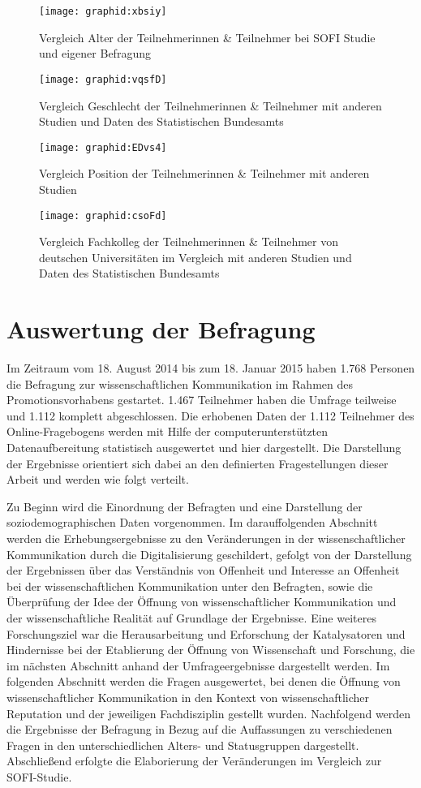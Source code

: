 \begin{figure}[h!]
\texttt{[image: graphid:xbsiy]}
\caption{Vergleich Alter der Teilnehmerinnen & Teilnehmer bei SOFI Studie und eigener Befragung}
\end{figure}

\begin{figure}[h!]
\texttt{[image: graphid:vqsfD]}
\caption{Vergleich Geschlecht der Teilnehmerinnen & Teilnehmer mit anderen Studien und Daten des Statistischen Bundesamts}
\end{figure}

\begin{figure}[h!]
\texttt{[image: graphid:EDvs4]}
\caption{Vergleich Position der Teilnehmerinnen & Teilnehmer mit anderen Studien}
\end{figure}

\begin{figure}[h!]
\texttt{[image: graphid:csoFd]}
\caption{Vergleich Fachkolleg der Teilnehmerinnen & Teilnehmer von deutschen Universitäten im Vergleich mit anderen Studien und Daten des Statistischen Bundesamts}
\end{figure}

\section{Auswertung der Befragung}

Im Zeitraum vom 18. August 2014 bis zum 18. Januar 2015 haben 1.768 Personen die Befragung zur wissenschaftlichen Kommunikation im Rahmen des Promotionsvorhabens gestartet. 1.467 Teilnehmer haben die Umfrage teilweise und 1.112 komplett abgeschlossen. Die erhobenen Daten der 1.112 Teilnehmer des Online-Fragebogens werden mit Hilfe der computerunterstützten Datenaufbereitung statistisch ausgewertet und hier dargestellt. Die Darstellung der Ergebnisse orientiert sich dabei an den definierten Fragestellungen dieser Arbeit und werden wie folgt verteilt.

Zu Beginn wird die Einordnung der Befragten und eine Darstellung der soziodemographischen Daten vorgenommen. Im darauffolgenden Abschnitt werden die Erhebungsergebnisse zu den Veränderungen in der wissenschaftlicher Kommunikation durch die Digitalisierung geschildert, gefolgt von der Darstellung der Ergebnissen über das Verständnis von Offenheit und Interesse an Offenheit bei der wissenschaftlichen Kommunikation unter den Befragten, sowie die Überprüfung der Idee der Öffnung von wissenschaftlicher Kommunikation und der wissenschaftliche Realität auf Grundlage der Ergebnisse. Eine weiteres Forschungsziel war die Herausarbeitung und Erforschung der Katalysatoren und Hindernisse bei der Etablierung der Öffnung von Wissenschaft und Forschung, die im nächsten Abschnitt anhand der Umfrageergebnisse dargestellt werden. Im folgenden Abschnitt werden die Fragen ausgewertet, bei denen die Öffnung von wissenschaftlicher Kommunikation in den Kontext von wissenschaftlicher Reputation und der jeweiligen Fachdisziplin gestellt wurden. Nachfolgend werden die Ergebnisse der Befragung in Bezug auf die Auffassungen zu verschiedenen Fragen in den unterschiedlichen Alters- und Statusgruppen dargestellt. Abschließend erfolgte die Elaborierung der Veränderungen im Vergleich zur SOFI-Studie.

